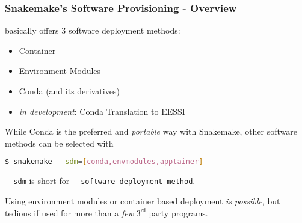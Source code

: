 \begin{frame}[fragile]
	\frametitle{Snakemake's Software Provisioning - Overview}
	\Snakemake{} basically offers 3 software deployment methods:
	\begin{itemize}[<+->]
		\item Container
		\item Environment Modules
		\item Conda (and its derivatives)
		\item \emph{in development}: Conda Translation to EESSI
	\end{itemize}
    \pause
    While Conda is the preferred and \emph{portable} way with Snakemake, other software methods can be selected with
    \begin{lstlisting}[language=Bash, style=Shell]
$ snakemake --sdm=[conda,envmodules,apptainer]
    \end{lstlisting}
    \verb+--sdm+ is short for \verb+--software-deployment-method+.
    \pause
    \begin{hint}
    	Using environment modules or container based deployment \emph{is possible}, but tedious if used for more than a \emph{few} $3^{\mathsf{rd}}$ party programs.
    \end{hint}
\end{frame}
%	
%
